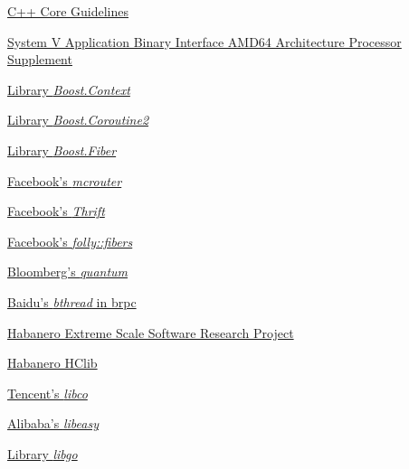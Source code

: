 \begin{thebibliography}{99}
        \href{http://isocpp.github.io/CppCoreGuidelines/CppCoreGuidelines#Ri-global}
        {C++ Core Guidelines}

        \href{http://software.intel.com/sites/default/files/article/402129/mpx-linux64-abi.pdf}
        {System V Application Binary Interface AMD64 Architecture Processor
        Supplement}

        \href{http://www.boost.org/doc/libs/release/libs/context/doc/html/index.html}
        {Library \emph{Boost.Context}}

        \href{http://www.boost.org/doc/libs/release/libs/coroutine2/doc/html/index.html}
        {Library \emph{Boost.Coroutine2}}

        \href{http://www.boost.org/doc/libs/release/libs/fiber/doc/html/index.html}
        {Library \emph{Boost.Fiber}}

        \href{https://code.facebook.com/posts/296442737213493/introducing-mcrouter-a-memcached-protocol-router-for-scaling-memcached-deployments}
        {Facebook's \emph{mcrouter}}

        \href{https://github.com/facebook/fbthrift}
        {Facebook's \emph{Thrift}}

        \href{https://github.com/facebook/folly/tree/master/folly/fibers}
        {Facebook's \emph{folly::fibers}}

        \href{https://github.com/bloomberg/quantum}
        {Bloomberg's \emph{quantum}}

        \href{https://brpc.apache.org/docs/bthread/}
        {Baidu's \emph{bthread} in brpc}

        \href{https://wiki.rice.edu/confluence/display/HABANERO/Habanero+Extreme+Scale+Software+Research+Project}
        {Habanero Extreme Scale Software Research Project}

        \href{https://github.com/habanero-rice/hclib}
        {Habanero HClib}

        \href{https://github.com/Tencent/libco}
        {Tencent's \emph{libco}}

        \href{https://github.com/oceanbase/oceanbase/tree/develop/deps/easy}
        {Alibaba's \emph{libeasy}}

        \href{https://github.com/yyzybb537/libgo}
        {Library \emph{libgo}}


\end{thebibliography}
